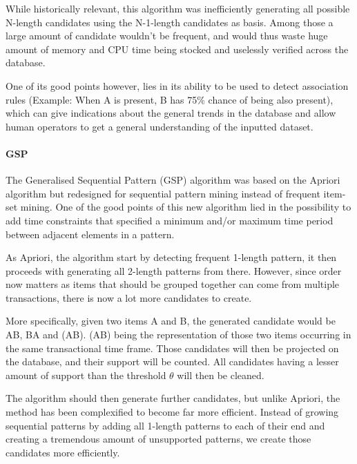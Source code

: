 \documentclass{eplmastersthesis}
\begin{document}
While historically relevant, this algorithm was inefficiently generating all possible N-length candidates using the N-1-length candidates as basis. Among those a large amount of candidate wouldn't be frequent, and would thus waste huge amount of memory and CPU time being stocked and uselessly verified across the database. \newline

One of its good points however, lies in its ability to be used to detect association rules (Example: When A is present, B has 75\% chance of being also present), which can give indications about the general trends in the database and allow human operators to get a general understanding of the inputted dataset.

\paragraph{GSP}

The Generalised Sequential Pattern (GSP) algorithm \cite{srikant1996mining} was based on the Apriori algorithm but redesigned for sequential pattern mining instead of frequent item-set mining. One of the good points of this new algorithm lied in the possibility to add time constraints that specified a minimum and/or maximum time period between adjacent elements in a pattern. \newline

As Apriori, the algorithm start by detecting frequent 1-length pattern, it then proceeds with generating all 2-length patterns from there. However, since order now matters as items that should be grouped together can come from multiple transactions, there is now a lot more candidates to create. \newline

More specifically, given two items A and B, the generated candidate would be AB, BA and (AB). (AB) being the representation of those two items occurring in the same transactional time frame. Those candidates will then be projected on the database, and their support will be counted. All candidates having a lesser amount of support than the threshold $\theta$ will then be cleaned. \newline

The algorithm should then generate further candidates, but unlike Apriori, the method has been complexified to become far more efficient. Instead of growing sequential patterns by adding all 1-length patterns to each of their end and creating a tremendous amount of unsupported patterns, we create those candidates more efficiently. \newline
\end{document}
